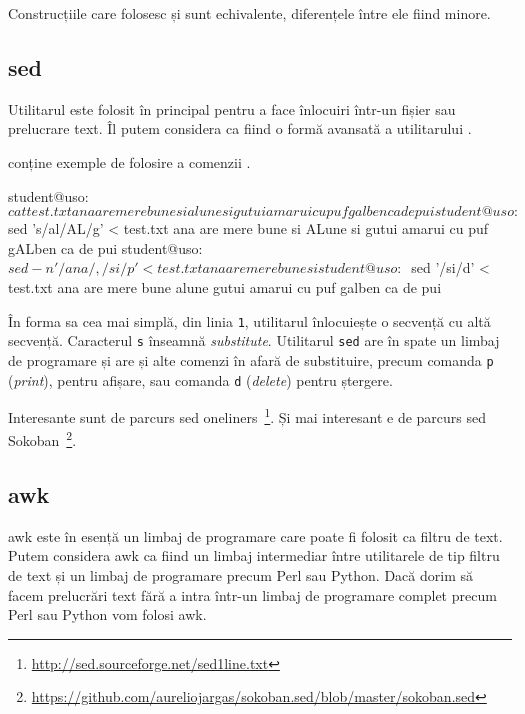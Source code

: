 Construcțiile care folosesc  și  sunt echivalente, diferențele între ele fiind minore.

\subsection{sed}
\label{sec:cli:advanced:sed}

Utilitarul  este folosit în principal pentru a face înlocuiri într-un fișier sau prelucrare text. Îl putem considera ca fiind o formă avansată a utilitarului .

 conține exemple de folosire a comenzii .

\begin{screen}[caption={Folosirea sed},label={lst:cli:sed}]
student@uso:~$ cat test.txt
ana
are
mere
bune
si
alune
si
gutui
amarui
cu
puf
galben
ca
de
pui
student@uso:~$ sed 's/al/AL/g' < test.txt
ana
are
mere
bune
si
ALune
si
gutui
amarui
cu
puf
gALben
ca
de
pui
student@uso:~$ sed -n '/ana/,/si/p' < test.txt
ana
are
mere
bune
si
student@uso:~$ sed '/si/d' < test.txt
ana
are
mere
bune
alune
gutui
amarui
cu
puf
galben
ca
de
pui
\end{screen}

În forma sa cea mai simplă, din linia \texttt{1}, utilitarul înlocuiește o secvență cu altă secvență. Caracterul \texttt{s} înseamnă \textit{substitute}. Utilitarul \texttt{sed} are în spate un limbaj de programare și are și alte comenzi în afară de substituire, precum comanda \texttt{p} (\textit{print}), pentru afișare, sau comanda \texttt{d} (\textit{delete}) pentru ștergere.

Interesante sunt de parcurs sed oneliners~\footnote{\url{http://sed.sourceforge.net/sed1line.txt}}. Și mai interesant e de parcurs sed Sokoban~\footnote{\url{https://github.com/aureliojargas/sokoban.sed/blob/master/sokoban.sed}}.

\subsection{awk}
\label{sec:cli:advanced:awk}

awk este în esență un limbaj de programare care poate fi folosit ca filtru de
text. Putem considera awk ca fiind un limbaj intermediar între utilitarele de
tip filtru de text și un limbaj de programare precum Perl sau Python. Dacă dorim
să facem prelucrări text fără a intra într-un limbaj de programare complet
precum Perl sau Python vom folosi awk.

